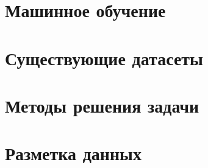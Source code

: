 \section{Машинное обучение} \label{sect1_2}


\section{Существующие датасеты} \label{sect1_2}


\section{Методы решения задачи} \label{sect1_3}


\section{Разметка данных} \label{sect1_4}
